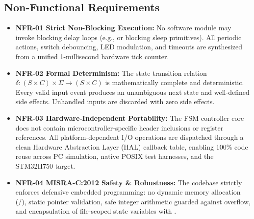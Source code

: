 
\subsection{Non-Functional Requirements}

\begin{itemize}
  \item \textbf{NFR-01 Strict Non-Blocking Execution:} No software module may invoke blocking delay loops
        (e.g.,  or blocking sleep primitives). All periodic actions, switch
        debouncing, LED modulation, and timeouts are synthesized from a unified 1-millisecond hardware tick counter.
  \item \textbf{NFR-02 Formal Determinism:} The state transition relation $\delta: (S \times C) \times \Sigma \to (S \times C)$
        is mathematically complete and deterministic. Every valid input event produces an unambiguous next state
        and well-defined side effects. Unhandled inputs are discarded with zero side effects.
  \item \textbf{NFR-03 Hardware-Independent Portability:} The FSM controller core does not contain microcontroller-specific
        header inclusions or register references. All platform-dependent I/O operations are dispatched through a
        clean Hardware Abstraction Layer (HAL) callback table, enabling 100\% code reuse across PC simulation,
        native POSIX test harnesses, and the STM32H750 target.
  \item \textbf{NFR-04 MISRA-C:2012 Safety \& Robustness:} The codebase strictly enforces defensive embedded
        programming: no dynamic memory allocation (/), static pointer validation, safe
        integer arithmetic guarded against overflow, and encapsulation of file-scoped state variables with .
\end{itemize}

